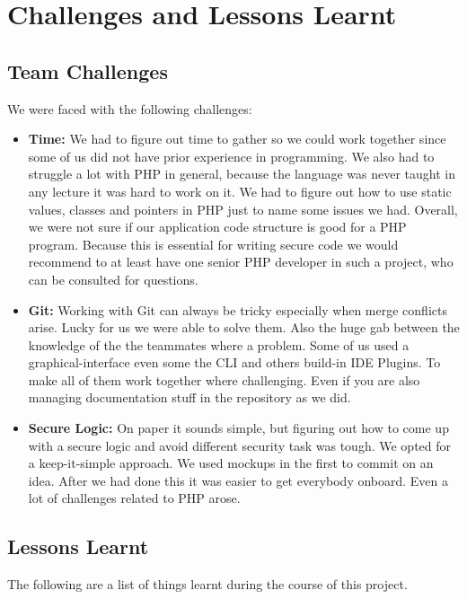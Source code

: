 \documentclass[12pt,a4paper]{article}
\begin{document}
	\section{Challenges and Lessons Learnt}
	
	\subsection{Team Challenges}
	
		We were faced with the following challenges:
		\begin{itemize}
			\item \textbf{Time:} We had to figure out time to gather so we could work together since some of us did not have prior
			experience in programming. We also had to struggle a lot with PHP in general, because the language was never taught in any lecture it was hard to work on it. We had to figure out how to use static values, classes and pointers in PHP just to name some issues we had. Overall, we were not sure if our application code structure is good for a PHP program. Because this is essential for writing secure code we would recommend to at least have one senior PHP developer in such a project, who can be consulted for questions.
			\item \textbf{Git:} Working with Git can always be tricky especially when merge conflicts arise. Lucky for us we were able to solve them. Also the huge gab between the knowledge of the the teammates where a problem. Some of us used a graphical-interface even some the CLI and others build-in IDE Plugins. To make all of them work together where challenging. Even if you are also managing documentation stuff in the repository as we did. 
			\item \textbf{Secure Logic:} On paper it sounds simple, but figuring out how to come up with a secure logic and avoid different security task was tough. We opted for a keep-it-simple approach. We used mockups in the first to commit on an idea. After we had done this it was easier to get everybody onboard. Even a lot of challenges related to PHP arose. 
		\end{itemize}
		
			
	\subsection{Lessons Learnt}
	
		The following are a list of things learnt during the course of this project.
		
\end{document}
